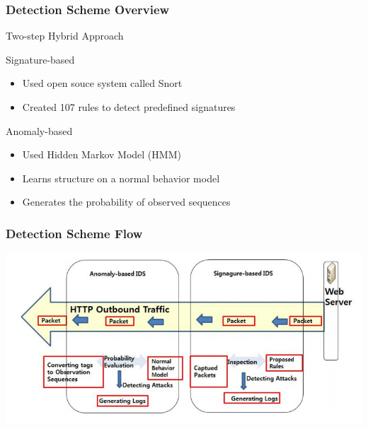 \documentclass[10pt,mathserif]{beamer}
\begin{document}
\begin{frame}
  \frametitle{Detection Scheme Overview}
  \begin{block}{Two-step Hybrid Approach}
    \begin{block}{Signature-based}
      \begin{itemize}
      \item Used open souce system called Snort
      \item Created 107 rules to detect predefined signatures
      \end{itemize}
    \end{block}
    \begin{block}{Anomaly-based}
      \begin{itemize}
      \item Used Hidden Markov Model (HMM)
      \item Learns structure on a normal behavior model
      \item Generates the probability of observed sequences
      \end{itemize}
    \end{block}
  \end{block}
\end{frame}
\begin{frame}
  \frametitle{Detection Scheme Flow}
  \includegraphics[width=\textwidth,natwidth=775,natheight=370]{figures/insider_detect_flow.png}
\end{frame}
\end{document}
